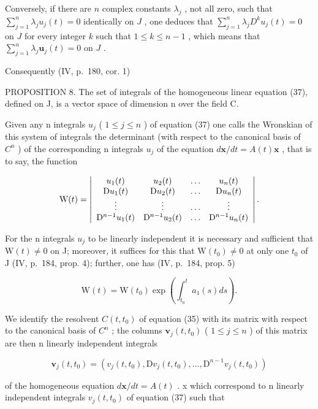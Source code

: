 Conversely, if there are \(n\) complex constants \(\lambda_j\) , not all zero, such that \(\sum_{j=1}^{n} \lambda_j u_j(t) = 0\) identically on \(J\) , one deduces that \(\sum_{j=1}^{n} \lambda_j D^k u_j(t) = 0\) on \(J\) for every integer \(k\) such that \(1 \leqslant k \leqslant n - 1\) , which means that \(\sum_{j=1}^{n} \lambda_j \mathbf{u}_j(t) = 0\) on \(J\) .

Consequently (IV, p.~180, cor. 1)

PROPOSITION 8. The set of integrals of the homogeneous linear equation (37), defined on J, is a vector space of dimension n over the field C.

Given any n integrals \(u_{j}\) ( \(1 \leqslant j \leqslant n\) ) of equation (37) one calls the Wronskian of this system of integrals the determinant (with respect to the canonical basis of \(C^{n}\) ) of the corresponding n integrals \(u_{j}\) of the equation \(d\mathbf{x}/dt = A(t)\mathbf{x}\) , that is to say, the function

\[
\mathrm{W} (t) = \left| \begin{array}{c c c c} u _ {1} (t) & u _ {2} (t) & \ldots & u _ {n} (t) \\ \mathrm{D} u _ {1} (t) & \mathrm{D} u _ {2} (t) & \ldots & \mathrm{D} u _ {n} (t) \\ \vdots & \vdots & \ldots & \vdots \\ \mathrm{D} ^ {n - 1} u _ {1} (t) & \mathrm{D} ^ {n - 1} u _ {2} (t) & \ldots & \mathrm{D} ^ {n - 1} u _ {n} (t) \end{array} \right|.
\]

For the n integrals \(u_{j}\) to be linearly independent it is necessary and sufficient that \(\mathrm{W}(t) \neq 0\) on J; moreover, it suffices for this that \(\mathrm{W}(t_{0}) \neq 0\) at only one \(t_{0}\) of J (IV, p.~184, prop. 4); further, one has (IV, p.~184, prop. 5)

\[
\mathrm{W} (t) = \mathrm{W} (t _ {0}) \exp \left(\int_ {t _ {0}} ^ {t} a _ {1} (s) d s\right).\tag{38}
\]

We identify the resolvent \(C(t, t_{0})\) of equation (35) with its matrix with respect to the canonical basis of \(C^{n}\) ; the columns \(\mathbf{v}_{j}(t, t_{0})\) ( \(1 \leqslant j \leqslant n\) ) of this matrix are then n linearly independent integrals

\[
\mathbf {v} _ {j} (t, t _ {0}) = (v _ {j} (t, t _ {0}), \mathrm{D} v _ {j} (t, t _ {0}), \dots , \mathrm{D} ^ {n - 1} v _ {j} (t, t _ {0}))
\]

of the homogeneous equation \(d\mathbf{x}/dt = A(t)\) . x which correspond to n linearly independent integrals \(v_{j}(t, t_{0})\) of equation (37) such that

